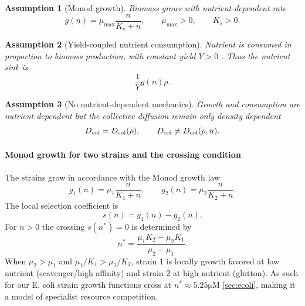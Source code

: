 \documentclass[11pt,a4paper]{report}
\newtheorem{assumption}{Assumption}
\begin{document}
	\begin{assumption}[Monod growth]
		Biomass grows with nutrient-dependent rate\cite{Monod}
		\begin{equation}
			g(n)=\mu_{\max}\frac{n}{K_s+n},
			\qquad \mu_{\max}>0,
			\qquad K_s>0.
			\label{eq:monod}
		\end{equation}
	\end{assumption}
	
	\begin{assumption}[Yield-coupled nutrient consumption]
		Nutrient is consumed in proportion to biomass production, with constant yield $Y>0$ \cite{Monod}. Thus the nutrient sink is
		\begin{equation}
			\frac{1}{Y}g(n)\rho.
			\label{eq:yield_sink}
		\end{equation}
	\end{assumption}
	
	\begin{assumption}[No nutrient-dependent mechanics]
		Growth and consumption are nutrient dependent but the collective diffusion remain only density dependent
		\begin{equation}
			D_{\rm col}=D_{\rm col}(\rho),
			\qquad
			D_{\rm col}\neq D_{\rm col}(\rho,n).
		\end{equation}
	\end{assumption}
\paragraph{Monod growth for two strains and the crossing condition}	
The strains grow in accordance with the Monod growth law \cite{Monod}
\begin{equation}
	g_1(n)=\mu_1\frac{n}{K_1+n},
	\qquad
	g_2(n)=\mu_2\frac{n}{K_2+n}.
\end{equation}
The local selection coefficient is
\begin{equation}
	s(n)=g_1(n)-g_2(n).
	\label{eq:selection-def}
\end{equation}
For \(n>0\) the crossing \(s(n^*)=0\) is determined by
\begin{equation}
	n^*=\frac{\mu_1K_2-
		\mu_2K_1}{\mu_2-
		\mu_1}.
	\label{eq:monod-crossing}
\end{equation}
When \(\mu_2>\mu_1\) and \(\mu_1/K_1>\mu_2/K_2\), strain 1 is locally growth favored at low nutrient (scavenger/high affinity) and strain 2 at high nutrient (glutton). As such for our E. coli strain growth functions cross at $n^*\approx5.25 \mathrm{\mu M}$ \ref{sec:ecoli}, making it a model of specialist resource competition.
\end{document}
